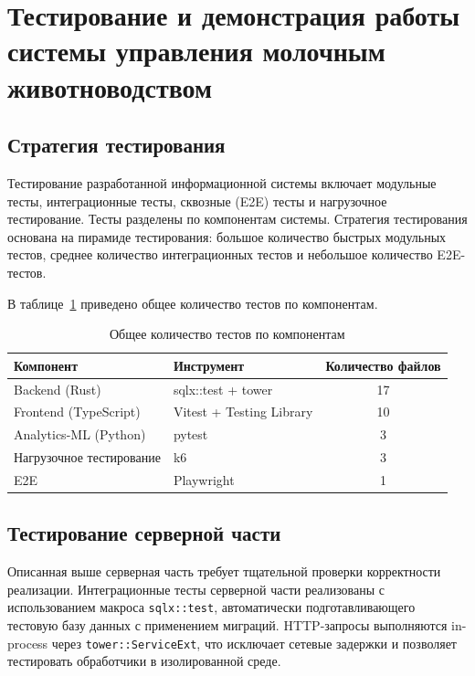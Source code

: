 \section{Тестирование и демонстрация работы системы управления молочным животноводством}

\subsection{Стратегия тестирования}

Тестирование разработанной информационной системы включает модульные тесты, интеграционные тесты, сквозные (E2E) тесты и нагрузочное тестирование. Тесты разделены по компонентам системы. Стратегия тестирования основана на пирамиде тестирования: большое количество быстрых модульных тестов, среднее количество интеграционных тестов и небольшое количество E2E-тестов.

В таблице~\ref{testsummary} приведено общее количество тестов по компонентам.

\begin{table}
  \caption{Общее количество тестов по компонентам}
  \begin{tabular}{|l|l|c|}
    \hline
    \textbf{Компонент} & \textbf{Инструмент} & \textbf{Количество файлов} \\
    \hline
    Backend (Rust) & sqlx::test + tower & 17 \\
    \hline
    Frontend (TypeScript) & Vitest + Testing Library & 10 \\
    \hline
    Analytics-ML (Python) & pytest & 3 \\
    \hline
    Нагрузочное тестирование & k6 & 3 \\
    \hline
    E2E & Playwright & 1 \\
    \hline
  \end{tabular}
  \label{testsummary}
\end{table}

\subsection{Тестирование серверной части}

Описанная выше серверная часть требует тщательной проверки корректности реализации. Интеграционные тесты серверной части реализованы с использованием макроса \texttt{sqlx::test}, автоматически подготавливающего тестовую базу данных с применением миграций. HTTP-запросы выполняются in-process через \texttt{tower::ServiceExt}, что исключает сетевые задержки и позволяет тестировать обработчики в изолированной среде.

